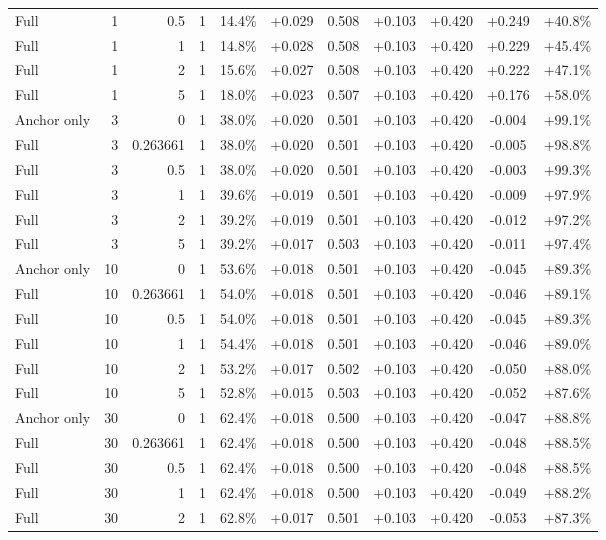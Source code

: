 \begin{table}[htbp]
\begin{tabular}{lrrrccccccc}
Full & 1 & 0.5 & 1 & 14.4\% & +0.029 & 0.508 & +0.103 & +0.420 & +0.249 & +40.8\% \\
Full & 1 & 1 & 1 & 14.8\% & +0.028 & 0.508 & +0.103 & +0.420 & +0.229 & +45.4\% \\
Full & 1 & 2 & 1 & 15.6\% & +0.027 & 0.508 & +0.103 & +0.420 & +0.222 & +47.1\% \\
Full & 1 & 5 & 1 & 18.0\% & +0.023 & 0.507 & +0.103 & +0.420 & +0.176 & +58.0\% \\
Anchor only & 3 & 0 & 1 & 38.0\% & +0.020 & 0.501 & +0.103 & +0.420 & -0.004 & +99.1\% \\
Full & 3 & 0.263661 & 1 & 38.0\% & +0.020 & 0.501 & +0.103 & +0.420 & -0.005 & +98.8\% \\
Full & 3 & 0.5 & 1 & 38.0\% & +0.020 & 0.501 & +0.103 & +0.420 & -0.003 & +99.3\% \\
Full & 3 & 1 & 1 & 39.6\% & +0.019 & 0.501 & +0.103 & +0.420 & -0.009 & +97.9\% \\
Full & 3 & 2 & 1 & 39.2\% & +0.019 & 0.501 & +0.103 & +0.420 & -0.012 & +97.2\% \\
Full & 3 & 5 & 1 & 39.2\% & +0.017 & 0.503 & +0.103 & +0.420 & -0.011 & +97.4\% \\
Anchor only & 10 & 0 & 1 & 53.6\% & +0.018 & 0.501 & +0.103 & +0.420 & -0.045 & +89.3\% \\
Full & 10 & 0.263661 & 1 & 54.0\% & +0.018 & 0.501 & +0.103 & +0.420 & -0.046 & +89.1\% \\
Full & 10 & 0.5 & 1 & 54.0\% & +0.018 & 0.501 & +0.103 & +0.420 & -0.045 & +89.3\% \\
Full & 10 & 1 & 1 & 54.4\% & +0.018 & 0.501 & +0.103 & +0.420 & -0.046 & +89.0\% \\
Full & 10 & 2 & 1 & 53.2\% & +0.017 & 0.502 & +0.103 & +0.420 & -0.050 & +88.0\% \\
Full & 10 & 5 & 1 & 52.8\% & +0.015 & 0.503 & +0.103 & +0.420 & -0.052 & +87.6\% \\
Anchor only & 30 & 0 & 1 & 62.4\% & +0.018 & 0.500 & +0.103 & +0.420 & -0.047 & +88.8\% \\
Full & 30 & 0.263661 & 1 & 62.4\% & +0.018 & 0.500 & +0.103 & +0.420 & -0.048 & +88.5\% \\
Full & 30 & 0.5 & 1 & 62.4\% & +0.018 & 0.500 & +0.103 & +0.420 & -0.048 & +88.5\% \\
Full & 30 & 1 & 1 & 62.4\% & +0.018 & 0.500 & +0.103 & +0.420 & -0.049 & +88.2\% \\
Full & 30 & 2 & 1 & 62.8\% & +0.017 & 0.501 & +0.103 & +0.420 & -0.053 & +87.3\% \\

\end{tabular}
\end{table}
